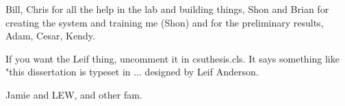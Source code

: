 \begin{acknowledgements}
Bill, Chris for all the help in the lab and building things, Shon and Brian for creating the system and training me (Shon) and for the preliminary results, Adam, Cesar, Kendy.

If you want the Leif thing, uncomment it in csuthesis.cls.  It says something like "this dissertation is typeset in ... designed by Leif Anderson.

Jamie and LEW, and other fam.
\end{acknowledgements}